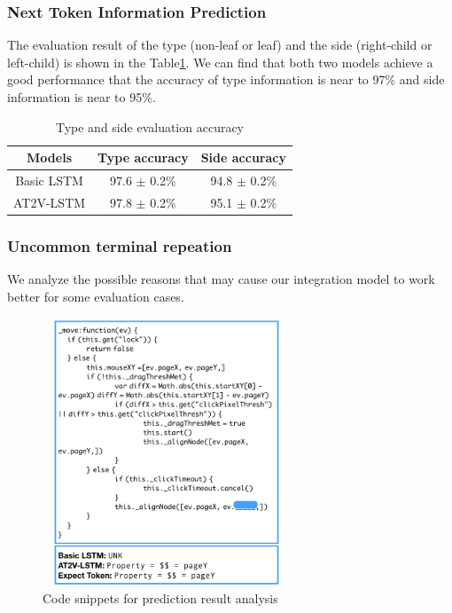 \documentclass[T, E]{compsoft}
\begin{document}
\subsubsection{Next Token Information Prediction}
The evaluation result of the type (non-leaf or leaf) and the side (right-child or left-child) is shown in the Table\ref{table:node-information-evaluation-accuracy}.
We can find that both two models achieve a good performance that the accuracy of type information is near to 97\% and side information is near to 95\%. 


\begin{table}
\centering
\begin{tabular}{ccc}
\hline
Models& Type accuracy& Side accuracy\\
\hline
Basic LSTM& 97.6 $\pm$ 0.2\% & 94.8 $\pm$ 0.2\% \\
AT2V-LSTM& 97.8 $\pm$ 0.2\% & 95.1 $\pm$ 0.2\% \\
\hline
\end{tabular}
\caption{Type and side evaluation accuracy}
\label{table:node-information-evaluation-accuracy}
\end{table}

\subsubsection{Uncommon terminal repeation}
We analyze the possible reasons that may cause our integration model to work better for some evaluation cases. 

\begin{figure}[!ht]
\centering
\includegraphics[height=8cm, width=7.4cm]{pictures/code_snippets_compare.png}
\caption{Code snippets for prediction result analysis}
\label{fig:code_snippets_compare}
\end{figure}
\end{document}
